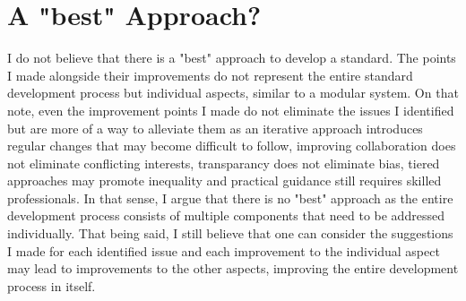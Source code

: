 \documentclass[12pt]{article}
\begin{document}
\section{A "best" Approach?}
I do not believe that there is a "best" approach to develop a standard. The points I made alongside their improvements do not represent the entire standard development process but individual aspects, similar to a modular system. 
\newline
On that note, even the improvement points I made do not eliminate the issues I identified but are more of a way to alleviate them as an iterative approach introduces regular changes that may become difficult to follow, improving collaboration does not eliminate conflicting interests, transparancy does not eliminate bias, tiered approaches may promote inequality and practical guidance still requires skilled professionals.
\newline
In that sense, I argue that there is no "best" approach as the entire development process consists of multiple components that need to be addressed individually. 
\newline
That being said, I still believe that one can consider the suggestions I made for each identified issue and each improvement to the individual aspect may lead to improvements to the other aspects, improving the entire development process in itself.
\end{document}
